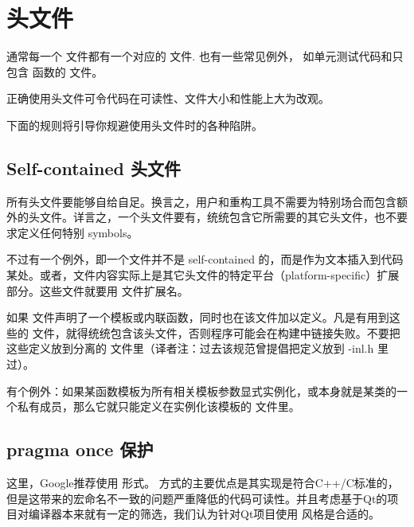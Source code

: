 \chapter{头文件}

通常每一个  文件都有一个对应的  文件. 也有一些常见例外， 如单元测试代码和只包含  函数的 文件。

正确使用头文件可令代码在可读性、文件大小和性能上大为改观。

下面的规则将引导你规避使用头文件时的各种陷阱。

\section{Self-contained 头文件} \label{self-contained-headers}


所有头文件要能够自给自足。换言之，用户和重构工具不需要为特别场合而包含额外的头文件。详言之，一个头文件要有，统统包含它所需要的其它头文件，也不要求定义任何特别 symbols。

不过有一个例外，即一个文件并不是 self-contained 的，而是作为文本插入到代码某处。或者，文件内容实际上是其它头文件的特定平台（platform-specific）扩展部分。这些文件就要用 文件扩展名。

如果  文件声明了一个模板或内联函数，同时也在该文件加以定义。凡是有用到这些的  文件，就得统统包含该头文件，否则程序可能会在构建中链接失败。不要把这些定义放到分离的  文件里（译者注：过去该规范曾提倡把定义放到 -inl.h 里过）。

有个例外：如果某函数模板为所有相关模板参数显式实例化，或本身就是某类的一个私有成员，那么它就只能定义在实例化该模板的  文件里。

\section{pragma once 保护} \label{pragma-once-guard}


\begin{DWarn}
	这里，Google推荐使用  形式。  方式的主要优点是其实现是符合C++/C标准的，但是这带来的宏命名不一致的问题严重降低的代码可读性。并且考虑基于Qt的项目对编译器本来就有一定的筛选，我们认为针对Qt项目使用  风格是合适的。
\end{DWarn}

